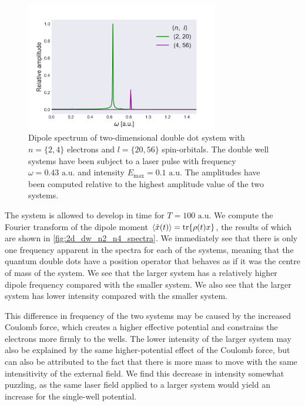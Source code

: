 \begin{figure}
    \centering
    \includegraphics[width=0.75\textwidth]{results/figures/DW/dw_n2_n4_spectrum.png} 
    \caption{Dipole spectrum of two-dimensional double dot system with $n=\{2,4\}$
        electrons and $l=\{20, 56\}$ spin-orbitals. The double well systems have been 
        subject to a laser pulse with frequency $\omega = 0.43 \text{ a.u.}$ and intensity 
        $E_\text{max} = 0.1 \text{ a.u.}$ The amplitudes have been computed relative to 
        the highest amplitude value of the two systems.
    }
    \label{fig:2d_dw_n2_n4_spectra}
\end{figure}

The system is allowed to develop in time for $T = 100 \text{ a.u.}$ We compute the Fourier 
transform of the dipole moment $\ev{\hat{x}(t)} = \tr{\rho(t) x}$, the results of which are shown 
in \autoref{fig:2d_dw_n2_n4_spectra}. We immediately see that there is only one frequency 
apparent in the spectra for each of the systems, meaning that the quantum double dots
have a position operator that behaves as if it was the centre of mass of the system. We 
see that the larger system has a relatively higher dipole frequency 
compared with the smaller system. We also see that the larger system has lower intensity compared
with the smaller 
system.

This difference in frequency of the two systems may be caused by the increased Coulomb
force, which
creates a higher effective potential and constrains the electrons more firmly to the wells.
The lower intensity of the larger system may also be explained by the same higher-potential effect 
of the Coulomb force, but can also be attributed to the fact that there is more mass to move with 
the same intensitivity of the external field. We find this decrease in intensity somewhat puzzling,
as the same laser field applied to a larger system would yield an increase for the single-well 
potential.

